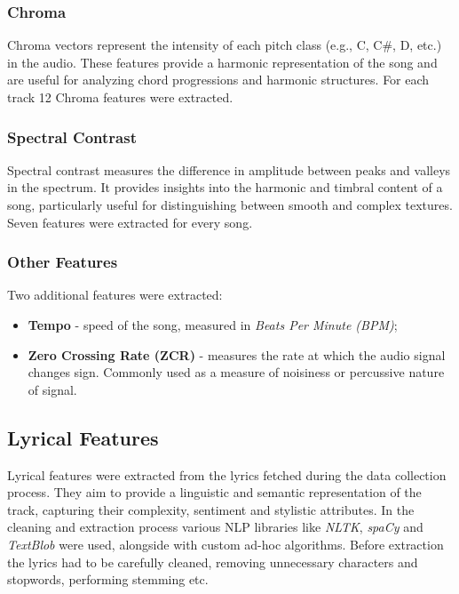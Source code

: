 \subsubsection*{Chroma}
Chroma vectors represent the intensity of each pitch class (e.g., C, C#, D,
etc.) in the audio. These features provide a harmonic representation of the
song and are useful for analyzing chord progressions and harmonic structures.
For each track 12 Chroma features were extracted.

\subsubsection*{Spectral Contrast}
Spectral contrast measures the difference in amplitude between peaks and
valleys in the spectrum. It provides insights into the harmonic and timbral
content of a song, particularly useful for distinguishing between smooth and
complex textures. Seven features were extracted for every song.

\subsubsection*{Other Features}
Two additional features were extracted:
\begin{itemize}
  \item \textbf{Tempo} - speed of the song, measured in
    \textit{Beats Per Minute (BPM)};
  \item \textbf{Zero Crossing Rate (ZCR)} - measures the rate at which the audio
    signal changes sign. Commonly used as a measure of noisiness or
    percussive nature of signal.
\end{itemize}


\subsection{Lyrical Features}
\label{sec:lyricalfeatures}

Lyrical features  were extracted from the lyrics fetched during the data
collection process. They aim to provide a linguistic and semantic
representation of the track, capturing their complexity, sentiment and
stylistic  attributes. In the cleaning and extraction  process various NLP
libraries like \textit{NLTK}, \textit{spaCy} and \textit{TextBlob} were used,
alongside with custom ad-hoc algorithms. Before extraction the lyrics  had to
be carefully cleaned, removing unnecessary characters and stopwords, performing
stemming etc.\cite{nltk,spacy,textblob} 

